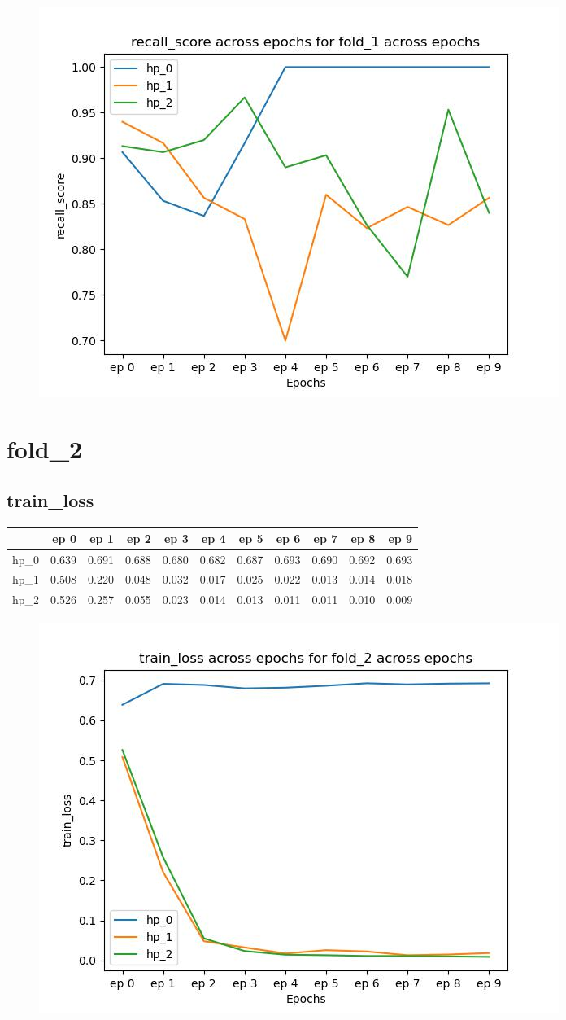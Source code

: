 \documentclass{article}
\begin{document}
\begin{figure}[H]
\includegraphics[scale = 0.75]{fold_1/recall_score}
\end{figure}
\section{fold\_2}
\subsection{train\_loss}
\begin{tabular}{lrrrrrrrrrr}
\toprule
{} &   ep 0 &   ep 1 &   ep 2 &   ep 3 &   ep 4 &   ep 5 &   ep 6 &   ep 7 &   ep 8 &   ep 9 \\
\midrule
hp\_0 &  0.639 &  0.691 &  0.688 &  0.680 &  0.682 &  0.687 &  0.693 &  0.690 &  0.692 &  0.693 \\
hp\_1 &  0.508 &  0.220 &  0.048 &  0.032 &  0.017 &  0.025 &  0.022 &  0.013 &  0.014 &  0.018 \\
hp\_2 &  0.526 &  0.257 &  0.055 &  0.023 &  0.014 &  0.013 &  0.011 &  0.011 &  0.010 &  0.009 \\
\bottomrule
\end{tabular}

\begin{figure}[H]
\includegraphics[scale = 0.75]{fold_2/train_loss}
\end{figure}
\end{document}
